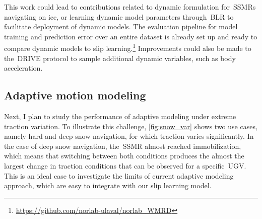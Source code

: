 This work could lead to contributions related to dynamic formulation for~\acp{SSMR} navigating on ice, or learning dynamic model parameters through~\ac{BLR} to facilitate deployment of dynamic models.
The evaluation pipeline for model training and prediction error over an entire dataset is already set up and ready to compare dynamic models to slip learning.\footnote{\url{https://github.com/norlab-ulaval/norlab_WMRD}}
Improvements could also be made to the~\ac{DRIVE} protocol to sample additional dynamic variables, such as body acceleration.
\subsection{Adaptive motion modeling}
Next, I plan to study the performance of adaptive modeling under extreme traction variation.
To illustrate this challenge, \autoref{fig:snow_var} shows two use cases, namely hard and deep snow navigation, for which traction varies significantly.
In the case of deep snow navigation, the~\ac{SSMR} almost reached immobilization, which means that switching between both conditions produces the almost the largest change in traction conditions that can be observed for a specific~\ac{UGV}.
This is an ideal case to investigate the limits of current adaptive modeling approach, which are easy to integrate with our slip learning model.
